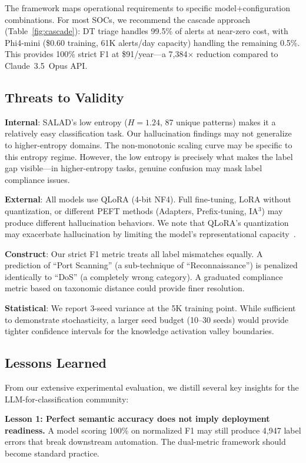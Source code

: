 \documentclass[journal]{IEEEtran}
\begin{document}
The framework maps operational requirements to specific model+configuration combinations. For most SOCs, we recommend the cascade approach (Table~\ref{fig:cascade}): DT triage handles 99.5\% of alerts at near-zero cost, with Phi4-mini (\$0.60 training, 61K alerts/day capacity) handling the remaining 0.5\%. This provides 100\% strict F1 at \$91/year---a 7,384$\times$ reduction compared to Claude~3.5~Opus API.

\subsection{Threats to Validity}

\textbf{Internal}: SALAD's low entropy ($H=1.24$, 87 unique patterns) makes it a relatively easy classification task. Our hallucination findings may not generalize to higher-entropy domains. The non-monotonic scaling curve may be specific to this entropy regime. However, the low entropy is precisely what makes the label gap visible---in higher-entropy tasks, genuine confusion may mask label compliance issues.

\textbf{External}: All models use QLoRA (4-bit NF4). Full fine-tuning, LoRA without quantization, or different PEFT methods (Adapters, Prefix-tuning, IA$^3$) may produce different hallucination behaviors. We note that QLoRA's quantization may exacerbate hallucination by limiting the model's representational capacity~\cite{dettmers2023}.

\textbf{Construct}: Our strict F1 metric treats all label mismatches equally. A prediction of ``Port Scanning'' (a sub-technique of ``Reconnaissance'') is penalized identically to ``DoS'' (a completely wrong category). A graduated compliance metric based on taxonomic distance could provide finer resolution.

\textbf{Statistical}: We report 3-seed variance at the 5K training point. While sufficient to demonstrate stochasticity, a larger seed budget (10--30 seeds) would provide tighter confidence intervals for the knowledge activation valley boundaries.

\subsection{Lessons Learned}
From our extensive experimental evaluation, we distill several key insights for the LLM-for-classification community:

\textbf{Lesson 1: Perfect semantic accuracy does not imply deployment readiness.} A model scoring 100\% on normalized F1 may still produce 4,947 label errors that break downstream automation. The dual-metric framework should become standard practice.
\end{document}

